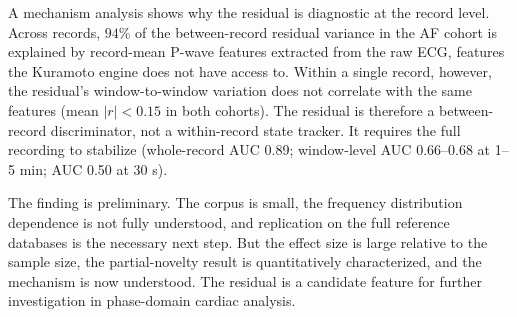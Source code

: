 \documentclass[11pt]{article}
\begin{document}
A mechanism analysis shows why the residual is diagnostic at the
record level. Across records, $94\%$ of the between-record residual
variance in the AF cohort is explained by record-mean P-wave features
extracted from the raw ECG, features the Kuramoto engine does not have
access to. Within a single record, however, the residual's
window-to-window variation does not correlate with the same features
(mean $|r| < 0.15$ in both cohorts). The residual is therefore a
between-record discriminator, not a within-record state tracker. It
requires the full recording to stabilize (whole-record AUC 0.89;
window-level AUC 0.66--0.68 at 1--5 min; AUC 0.50 at 30 s).

The finding is preliminary. The corpus is small, the frequency
distribution dependence is not fully understood, and replication on the
full reference databases is the necessary next step. But the effect
size is large relative to the sample size, the partial-novelty result
is quantitatively characterized, and the mechanism is now understood.
The residual is a candidate feature for further investigation in
phase-domain cardiac analysis.
\end{document}
